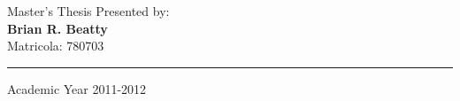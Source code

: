 \begin{titlepage}
\begin{flushleft}
\end{flushleft}
\vspace*{1.0cm}
\begin{flushright}


  Master's Thesis Presented by:\\ \vspace*{0.5em}\textbf{\LARGE Brian R. Beatty}\\ \vspace*{0.5em}\normalsize Matricola: 780703 \\ 
\vspace*{2em}
\rule{\linewidth}{0.5mm}

\end{flushright}
\vspace*{0.5cm}
\begin{center}



  Academic Year 2011-2012
\end{center} \clearpage

\end{titlepage}